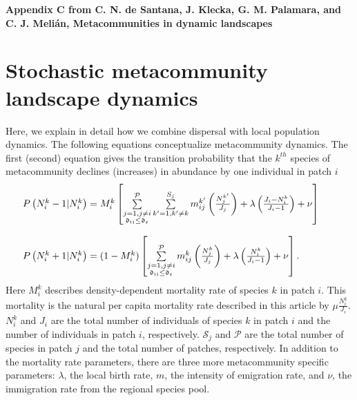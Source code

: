 \documentclass[12pt]{article}
\begin{document}
\clearpage
\begin{flushleft} 
{\Large \textbf{Appendix C from C. N. de Santana, J. Klecka, G. M. Palamara, and C. J. Meli\'{a}n, Metacommunities in dynamic landscapes}}
\end{flushleft}

\renewcommand{\theequation}{C-\arabic{equation}}
\setcounter{equation}{0}
\renewcommand{\thesection}{C\arabic{section}}
\renewcommand{\thefigure}{C\arabic{figure}}
\renewcommand{\thetable}{C\arabic{table}}
\setcounter{figure}{0}
\setcounter{table}{0}

\section*{Stochastic metacommunity landscape dynamics}
\label{Population dispersal model}

Here, we explain in detail how we combine dispersal with local
population dynamics. The following equations conceptualize
metacommunity dynamics. The first (second) equation gives the
transition probability that the $k^{th}$ species of
metacommunity declines (increases) in abundance by one individual in
patch $i$
\begin{equation}
\begin{array}{lcr}
\hspace{-0.25 in}P \left(N_{i}^{k} - 1 | N_{i}^{k} \right) = M^{k}_{i} \left[\sum\limits^{\mathcal{P}}_{\substack{j = 1,j \ne i \\ \mathfrak{d_{ij}} \leq \mathfrak{d_{c}}}}
 \sum\limits_{k'=1,k'\ne k}^{S_{j}} m_{ij}^{k'} \left(\frac{N_{j}^{k'}}{J_{j}}\right) + \lambda \left(\frac{J_{i} - N_{i}^{k}}{J_{i} - 1}\right) + \nu \right]\\[0.5cm]
\\
\hspace{-0.25 in}P \left(N_{i}^{k} + 1 | N_{i}^{k}\right) = (1 - M^{k}_{i}) \left[
\sum\limits^{\mathcal{P}}_{\substack{j = 1,j \ne i \\ \mathfrak{d_{ij}} \leq \mathfrak{d_{c}}}}
 m_{ij}^{k} \left(\frac{N_{j}^{k}}{J_{j}}\right) + \lambda \left(\frac{N_{i}^{k}}{J_{i} - 1}\right) + \nu \right].
\end{array}
\label{master}
\end{equation}
Here $M^{k}_{i}$ describes density-dependent mortality rate of species
$k$ in patch $i$. This mortality is the natural per capita mortality
rate described in this article by $\mu
\frac{N_{i}^{k}}{J_{i}}$. $N_{i}^{k}$ and $J_{i}$ are the total number of
individuals of species $k$ in patch $i$ and the number of individuals
in patch $i$, respectively. $\mathcal{S}_{j}$ and $\mathcal{P}$ are
the total number of species in patch $j$ and the total number of
patches, respectively. In addition to the mortality rate parameters,
there are three more metacommunity specific parameters: $\lambda$, the
local birth rate, $m$, the intensity of emigration rate, and $\nu$,
the immigration rate from the regional species pool.
\end{document}
